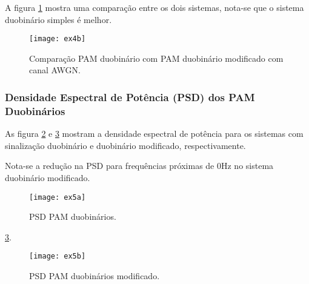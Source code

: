 A figura \ref{fig:ex4b} mostra uma comparação entre os dois sistemas, nota-se 
que o sistema duobinário simples é melhor.
\begin{figure}[H]
  \centering
  \caption{Comparação PAM duobinário com PAM duobinário modificado com canal 
  AWGN.}
  \texttt{[image: ex4b]}
  \label{fig:ex4b}
\end{figure}

\subsubsection{Densidade Espectral de Potência (PSD) dos PAM Duobinários}
 As figura \ref{fig:ex5a} e \ref{fig:ex5b} mostram a densidade espectral de 
 potência para os sistemas com sinalização duobinário e duobinário modificado, 
 respectivamente.
 
 Nota-se a redução na PSD para frequências próximas de 0Hz no sistema 
 duobinário modificado.
 
\begin{figure}[H]
  \centering
  \caption{PSD PAM duobinários.}
  \texttt{[image: ex5a]}
  \label{fig:ex5a}
\end{figure}

\ref{fig:ex5b}.
\begin{figure}[H]
  \centering
  \caption{PSD PAM duobinários modificado.}
  \texttt{[image: ex5b]}
  \label{fig:ex5b}
\end{figure}